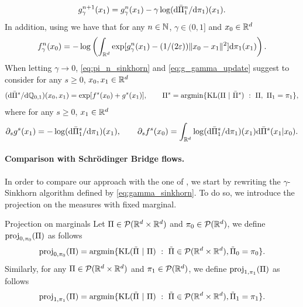 \documentclass{article}
\begin{document}
\begin{equation}
\label{eq:g_gamma_update}
    g_\gamma^{n+1}(x_1) = g_\gamma^n(x_1) - \gamma \log (\rmd \bar{\Pi}^n_1 / \rmd \pi_1)(x_1) . 
\end{equation}
In addition, using \cite[Equation (9)]{karimi2024sinkhorn} we have that for any $n \in \mathbb{N}$, $\gamma \in (0,1]$ and $x_0 \in \mathbb{R}^d$
\begin{equation}
     f_\gamma^n(x_0) = - \log \left(\int_{\mathbb{R}^d} \exp[g_\gamma^n(x_1) - (1/(2\varepsilon)) \| x_0 - x_1 \|^2] \mathrm{d} \pi_1(x_1)\right) . 
\end{equation}
When letting $\gamma \to 0$, \eqref{eq:pi_n_sinkhorn} and \eqref{eq:g_gamma_update} suggest to consider for any $s \geq 0$, $x_0, x_1 \in \mathbb{R}^d$
\begin{equation}
    (\mathrm{d} \bar{\Pi}^s / \mathrm{d} \mathbb{Q}_{0,1})(x_0, x_1) = \exp[f^s(x_0) + g^s(x_1)] , \qquad \Pi^s = \mathrm{argmin} \{  \mathrm{KL}(\Pi \ | \ \bar{\Pi}^s)  \ : \ \Pi, \ \Pi_1 = \pi_1 \} , 
\end{equation}
where for any $s \geq 0$, $x_1 \in \mathbb{R}^d$
\begin{equation}
\label{eq:flow_f_g}
     \partial_s g^s(x_1) = - \log (\rmd \bar{\Pi}^s_1 / \rmd \pi_1)(x_1) , \qquad \partial_s f^s(x_0) = \int_{\rset^d} \log (\rmd \bar{\Pi}^s_1 / \rmd \pi_1)(x_1) \rmd \bar{\Pi}^s(x_1|x_0) . 
\end{equation}

\paragraph{Comparison with Schr\"odinger Bridge flows.} In order to compare our approach with the one of \cite{karimi2024sinkhorn}, we start by rewriting the $\gamma$-Sinkhorn algorithm defined by \eqref{eq:gamma_sinkhorn}. To do so, we introduce the projection on the measures with fixed marginal. 

\begin{definition}{Projection on marginals}{}
Let $\Pi \in \mathcal{P}(\mathbb{R}^d \times \mathbb{R}^d)$ and $\pi_0 \in \mathcal{P}(\mathbb{R}^d)$, we define $\mathrm{proj}_{0, \pi_0}(\Pi)$ as follows
\begin{equation}
    \mathrm{proj}_{0, \pi_0}(\Pi) = \mathrm{argmin} \{ \mathrm{KL}(\tilde{\Pi} \ | \ \Pi) \ : \ \tilde{\Pi} \in \mathcal{P}(\mathbb{R}^d \times \mathbb{R}^d), \tilde{\Pi}_0 = \pi_0 \} . 
 \end{equation}
 Similarly, for any 
 $\Pi \in \mathcal{P}(\mathbb{R}^d \times \mathbb{R}^d)$ and $\pi_1 \in \mathcal{P}(\mathbb{R}^d)$, we define $\mathrm{proj}_{1, \pi_1}(\Pi)$ as follows
\begin{equation}
    \mathrm{proj}_{1, \pi_1}(\Pi) = \mathrm{argmin} \{ \mathrm{KL}(\tilde{\Pi} \ | \ \Pi) \ : \ \tilde{\Pi} \in \mathcal{P}(\mathbb{R}^d \times \mathbb{R}^d), \tilde{\Pi}_1 = \pi_1 \} . 
 \end{equation}
\end{definition}
\end{document}
